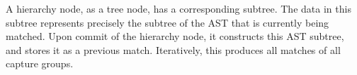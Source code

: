 \documentclass[english]{sigplanconf}
\theoremstyle{definition}
\begin{document}
A hierarchy node, as a tree node, has a corresponding subtree. The
data in this subtree represents precisely the subtree of the AST that
is currently being matched. Upon commit of the hierarchy node, it
constructs this AST subtree, and stores it as a previous match. Iteratively,
this produces all matches of all capture groups.

\end{document}
